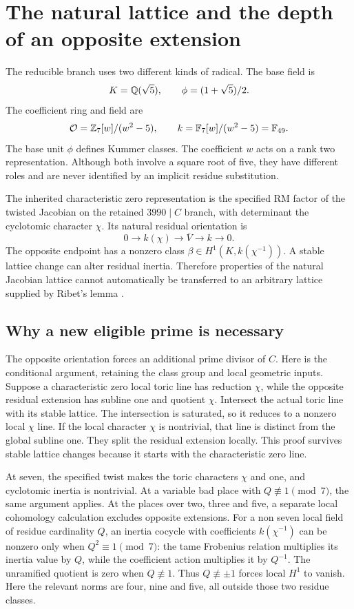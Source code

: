 \section{The natural lattice and the depth of an opposite extension}\label{sec:depth}
The reducible branch uses two different kinds of radical. The base field is
\[
K=\mathbb Q(\sqrt5),\qquad\phi=(1+\sqrt5)/2.
\]
The coefficient ring and field are
\[
\mathcal O=\mathbb Z_7[w]/(w^2-5),\qquad k=\mathbb F_7[w]/(w^2-5)=\mathbb F_{49}.
\]
The base unit $\phi$ defines Kummer classes. The coefficient $w$ acts on a rank two representation. Although both involve a square root of five, they have different roles and are never identified by an implicit residue substitution.

The inherited characteristic zero representation is the specified RM factor of the twisted Jacobian on the retained $3990\mid C$ branch, with determinant the cyclotomic character $\chi$. Its natural residual orientation is
\[
0\longrightarrow k(\chi)\longrightarrow\overline V\longrightarrow k\longrightarrow0.
\]
The opposite endpoint has a nonzero class $\beta\in H^1(K,k(\chi^{-1}))$. A stable lattice change can alter residual inertia. Therefore properties of the natural Jacobian lattice cannot automatically be transferred to an arbitrary lattice supplied by Ribet's lemma \cite{ophir-weiss2024}.

\subsection{Why a new eligible prime is necessary}
The opposite orientation forces an additional prime divisor of $C$. Here is the conditional argument, retaining the class group and local geometric inputs. Suppose a characteristic zero local toric line has reduction $\chi$, while the opposite residual extension has subline one and quotient $\chi$. Intersect the actual toric line with its stable lattice. The intersection is saturated, so it reduces to a nonzero local $\chi$ line. If the local character $\chi$ is nontrivial, that line is distinct from the global subline one. They split the residual extension locally. This proof survives stable lattice changes because it starts with the characteristic zero line.

At seven, the specified twist makes the toric characters $\chi$ and one, and cyclotomic inertia is nontrivial. At a variable bad place with $Q\not\equiv1\pmod7$, the same argument applies. At the places over two, three and five, a separate local cohomology calculation excludes opposite extensions. For a non seven local field of residue cardinality $Q$, an inertia cocycle with coefficients $k(\chi^{-1})$ can be nonzero only when $Q^2\equiv1\pmod7$: the tame Frobenius relation multiplies its inertia value by $Q$, while the coefficient action multiplies it by $Q^{-1}$. The unramified quotient is zero when $Q\not\equiv1$. Thus $Q\not\equiv\pm1$ forces local $H^1$ to vanish. Here the relevant norms are four, nine and five, all outside those two residue classes.

